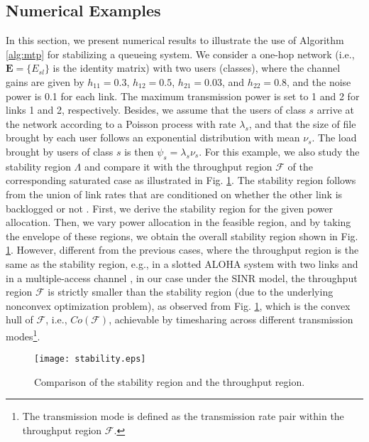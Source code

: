 \documentclass[10pt,journal,letterpaper,compsoc]{IEEEtran}
\begin{document}
{{\subsection{Numerical Examples}
In this section, we present numerical results to illustrate the use of Algorithm \ref{alg:mtp} for stabilizing a queueing system. We consider a one-hop network (i.e., $\mathbf{E}=\{E_{sl}\}$ is the identity matrix) with two users (classes), where the channel gains are given by $h_{11}=0.3$, $h_{12}=0.5$, $h_{21}=0.03$, and $h_{22}=0.8$, and the noise power is 0.1 for each link. The maximum transmission power is set to 1 and 2 for links 1 and 2, respectively. Besides, we assume that the users of class $s$ arrive at the network according to a Poisson process with rate $\lambda_s$, and that the size of file brought by each user follows an exponential distribution with mean $\nu_s$. The load brought by users of class $s$ is then $\psi_s=\lambda_s\nu_s$. For this example, we also study the stability region $\Lambda$ and compare it with the throughput region $\mathcal{F}$ of the corresponding saturated case as illustrated in Fig. \ref{fig:stability region}. The stability region follows from the union of link rates that are conditioned on whether the other link is backlogged or not \cite{rao:1988,parande:2008}. First, we derive the stability region for the given power allocation. Then, we vary power allocation in the feasible region, and by taking the envelope of these regions, we obtain the overall stability region shown in Fig. \ref{fig:stability region}. However, different from the previous cases, where the throughput region is the same as the stability region, e.g., in a slotted ALOHA system with two links \cite{rao:1988} and in a multiple-access channel \cite{parande:2008}, in our case under the SINR model, the throughput region $\mathcal{F}$ is strictly smaller than the stability region (due to the underlying nonconvex optimization problem), as observed from Fig. \ref{fig:stability region}, which is the convex hull of $\mathcal{F}$, i.e., $Co(\mathcal{F})$, achievable by timesharing across different transmission modes\footnote{The transmission mode is defined as the transmission rate pair within the throughput region $\mathcal{F}$.}.

\begin{figure}[t]
\begin{center}
\vspace{-0.0cm}\hspace{0cm} {\texttt{[image: stability.eps]}}\hspace{-0cm}
\vspace{0cm} \caption{Comparison of the stability region and the throughput region.}\vspace{-0.0cm}
\label{fig:stability region}
\end{center}
\end{figure}

}}
\end{document}
